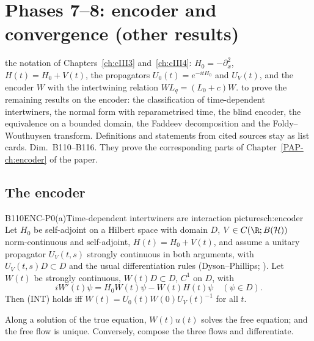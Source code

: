 \chapter[Encoder and convergence]{Phases 7--8: encoder and convergence (other results)}\label{ch:cIV2}
\chapterbrief
{the notation of Chapters~\ref{ch:cIII3} and~\ref{ch:cIII4}: $H_0=-\partial_x^2$, $H(t)=H_0+V(t)$, the propagators $U_0(t)=e^{-itH_0}$ and $U_V(t)$, and the encoder $W$ with the intertwining relation $W L_q=(L_0+c)W$.}
{to prove the remaining results on the encoder: the classification of time-dependent intertwiners, the normal form with reparametrised time, the blind encoder, the equivalence on a bounded domain, the Faddeev decomposition and the Foldy--Wouthuysen transform. Definitions and statements from cited sources stay as list cards.}
{Dim.~B110--B116. They prove the corresponding parts of Chapter~\ref{PAP-ch:encoder} of the paper.}

\section{The encoder}


\begin{dimcard}{B110}{ENC-P0(a)}{Time-dependent intertwiners are interaction pictures}{\pw}{ch:encoder}
Let $H_0$ be self-adjoint on a Hilbert space with domain $D$, $V\in C(\R;B(\mathcal H))$ norm-continuous and self-adjoint, $H(t)=H_0+V(t)$, and assume a unitary propagator $U_V(t,s)$ strongly continuous in both arguments, with $U_V(t,s)D\subset D$ and the usual differentiation rules (Dyson--Phillips; \cf). Let $W(t)$ be strongly continuous, $W(t)D\subset D$, $C^1$ on $D$, with
\[
iW'(t)\psi=H_0W(t)\psi-W(t)H(t)\psi\quad(\psi\in D).\tag{INT}
\]
Then (INT) holds iff $W(t)=U_0(t)W(0)U_V(t)^{-1}$ for all $t$.
\end{dimcard}

\begin{proofidea}
Along a solution of the true equation, $W(t)u(t)$ solves the free equation; and the free flow is unique. Conversely, compose the three flows and differentiate.
\end{proofidea}


